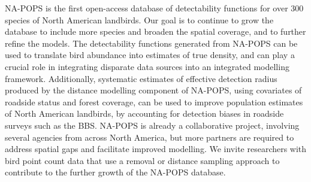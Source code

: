 \par NA-POPS is the first open-access database of detectability functions for over 300 species of North American landbirds. Our goal is to continue to grow the database to include more species and broaden the spatial coverage, and to further refine the models. The detectability functions generated from NA-POPS can be used to translate bird abundance into estimates of true density, and can play a crucial role in integrating disparate data sources into an integrated modelling framework. Additionally, systematic estimates of effective detection radius produced by the distance modelling component of NA-POPS, using covariates of roadside status and forest coverage, can be used to improve population estimates of North American landbirds, by accounting for detection biases in roadside surveys such as the BBS. NA-POPS is already a collaborative project, involving several agencies from across North America, but more partners are required to address spatial gaps and facilitate improved modelling. We invite researchers with bird point count data that use a removal or distance sampling approach to contribute to the further growth of the NA-POPS database.